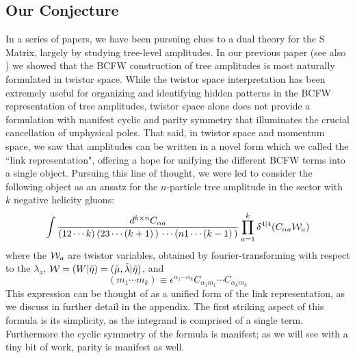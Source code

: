 \documentclass[12pt]{article}
\begin{document}
\subsection{Our Conjecture}

In a series of papers, we have been pursuing clues to a dual theory for the S Matrix, largely by studying tree-level amplitudes. In our previous paper \cite{ArkaniHamed:2009si} (see also \cite{lioneldavid}) we showed that the BCFW construction of tree amplitudes is most naturally formulated in twistor space. While the twistor space interpretation has been extremely useful for organizing and identifying hidden patterns in the BCFW representation of tree amplitudes, twistor space alone does not provide a formulation with manifest cyclic and parity symmetry that illuminates the crucial cancellation of unphysical poles.  That said, in twistor space and momentum space, we saw that amplitudes can be written in a novel form which we called the ``link representation", offering a hope for unifying the different BCFW terms into a single object. Pursuing this line of thought, we were led to consider the following object as an ansatz for the $n$-particle tree amplitude in the sector with $k$ negative helicity gluons:
\begin{equation} \label{first}
\int \frac{d^{k \times n} C_{\alpha a}}{(12\cdots k) \,
(23\cdots (k+1)\, ) \, \cdots (n 1 \cdots (k-1)\,)} \prod_{\alpha =
1}^k \delta^{4|4}(C_{\alpha a} {\cal W}_a)
\end{equation}
where the ${\cal W}_a$ are twistor variables, obtained by
fourier-transforming with respect to the $\lambda_a$, ${\cal W} = (W
| \tilde \eta) = (\tilde \mu, \tilde \lambda| \tilde \eta)$,  and
\begin{equation}
(m_1 \cdots m_k) \equiv \epsilon^{\alpha_1 \cdots \alpha_k} C_{\alpha_1 m_1} \cdots C_{\alpha_k m_k} \end{equation}
This expression can be thought of as a unified form of the link representation, as we discuss in further detail in the appendix. The first striking aspect of this formula is its simplicity, as the integrand is comprised of a single term.
Furthermore the cyclic symmetry of the formula is manifest; as we will see with a tiny bit of work, parity is manifest as well.
\end{document}
